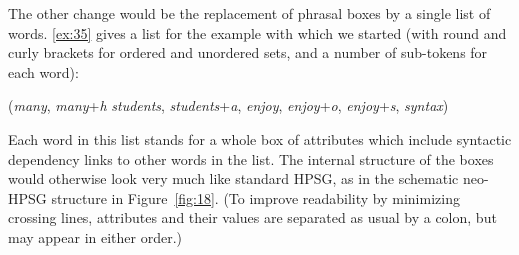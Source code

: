 \documentclass[output=paper]{langscibook}
\begin{document}
The other change would be the replacement of phrasal boxes by a single list of words. \ref{ex:35} gives a list for the example with which we started (with round and curly brackets for ordered and unordered sets, and a number of sub-tokens for each word):

\begin{exe}
	\ex \label{ex:35} ({\emph{many}, \emph{many}+\emph{h}} {\emph{students}, \emph{students}+\emph{a}}, {\emph{enjoy}, \emph{enjoy}+\emph{o}, \emph{enjoy}+\emph{s}}, \emph{syntax})
\end{exe}

Each word in this list stands for a whole box of attributes which include syntactic dependency links to other words in the list. The internal structure of the boxes would otherwise look very much like standard HPSG, as in the schematic neo-HPSG structure in Figure~\ref{fig:18}. (To improve readability by minimizing crossing lines, attributes and their values are separated as usual by a colon, but may appear in either order.)
\end{document}
